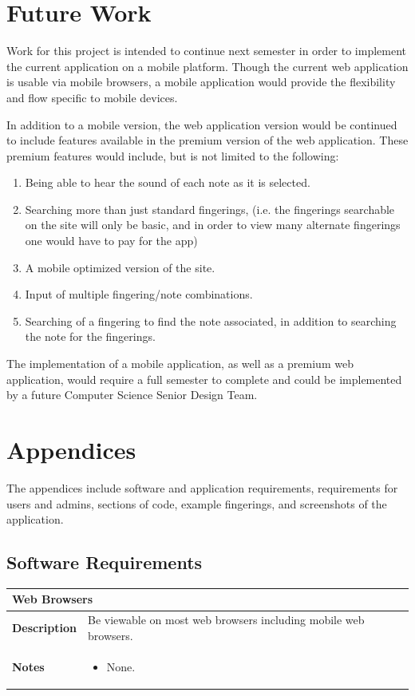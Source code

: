 \documentclass[12pt,english]{article}
\providecommand{\tabularnewline}{\\}
\providecommand{\tabularnewline}{\\}
\begin{document}
\section{Future Work}

Work for this project is intended to continue next semester in order
to implement the current application on a mobile platform. Though
the current web application is usable via mobile browsers, a mobile
application would provide the flexibility and flow specific to mobile
devices.

In addition to a mobile version, the web application version would
be continued to include features available in the premium version
of the web application. These premium features would include, but
is not limited to the following:
\begin{enumerate}
\item Being able to hear the sound of each note as it is selected. 
\item Searching more than just standard fingerings, (i.e. the fingerings
searchable on the site will only be basic, and in order to view many
alternate fingerings one would have to pay for the app) 
\item A mobile optimized version of the site. 
\item Input of multiple fingering/note combinations. 
\item Searching of a fingering to find the note associated, in addition
to searching the note for the fingerings. 
\end{enumerate}
The implementation of a mobile application, as well as a premium web
application, would require a full semester to complete and could be
implemented by a future Computer Science Senior Design Team. \clearpage{}


\section{Appendices}

The appendices include software and application requirements, requirements
for users and admins, sections of code, example fingerings, and screenshots
of the application.


\subsection{Software Requirements}

\begin{tabular}{|p{3cm}|p{13cm}|}
\hline 
\multicolumn{2}{|l|}{\textbf{Web Browsers}}\tabularnewline
\hline 
\textbf{Description}  & Be viewable on most web browsers including mobile web browsers. \tabularnewline
\hline 
\textbf{Notes}  & \begin{itemize}
\item None. \end{itemize}
\tabularnewline
\hline 
\end{tabular}\\[0.5cm]
\end{document}
